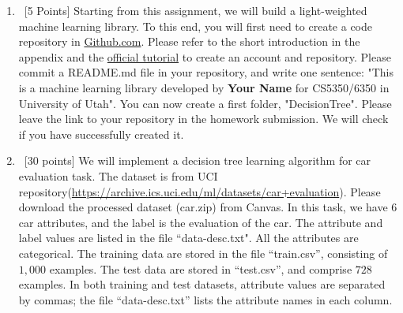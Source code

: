 \documentclass[12pt, fullpage,letterpaper]{article}
\begin{document}
\begin{enumerate}
	\item~[5 Points] Starting from this assignment, we will build a light-weighted machine learning library. 
To this end, you will first need to create a code repository in \href{https://github.com/}{Github.com}. Please refer to the short introduction in the appendix and the \href{https://guides.github.com/activities/hello-world/}{official tutorial} to create an account and repository. Please commit a README.md file in your repository, and write one sentence: "This is a machine learning library developed by \textbf{Your Name} for CS5350/6350 in University of Utah".  You can now create a first folder, "DecisionTree". Please leave the link to your repository in the homework submission. We will check if you have successfully created it. 


\item~[30 points] We will implement a decision tree learning algorithm for car evaluation task. The dataset is from UCI repository(\url{https://archive.ics.uci.edu/ml/datasets/car+evaluation}). Please download the processed dataset (car.zip) from Canvas.  In this task, we have $6$ car attributes, and the label is the evaluation of the car. The attribute and label values are listed in the file ``data-desc.txt". All the attributes are categorical. The training data are stored in the file ``train.csv'', consisting of $1,000$ examples. The test data are stored in ``test.csv'', and comprise $728$ examples. In both training and test datasets, attribute values are separated by commas; the file ``data-desc.txt''  lists the attribute names in each column. 
\\


\end{enumerate}
\end{document}
